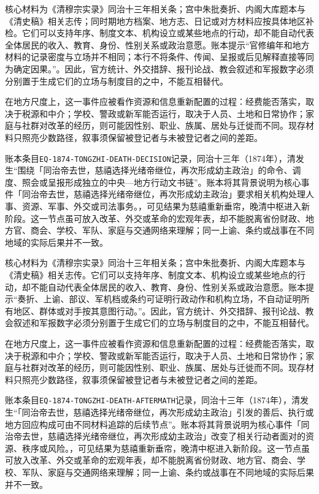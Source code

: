 核心材料为《清穆宗实录》同治十三年相关条；宫中朱批奏折、内阁大库题本与《清史稿》相关志传；同时期地方档案、地方志、日记或对方材料应按具体地区补检。它们可以支持年序、制度文本、机构设立或某些地点的行动，却不能自动代表全体居民的收入、教育、身份、性别关系或政治意愿。账本提示“官修编年和地方材料的记录密度与立场并不相同；本行不将条件、传闻、呈报或后见解释直接等同为确定因果。”。因此，官方统计、外交措辞、报刊论战、教会叙述和军报数字必须分别置于生成它们的立场与制度目的之中，不能互相替代。

在地方尺度上，这一事件应被看作资源和信息重新配置的过程：经费能否落实，取决于税源和中介；学校、警政或新军能否运行，取决于人员、土地和日常协作；家庭与社群对改革的经历，则可能因性别、职业、族属、居处与迁徙而不同。现存材料只照亮少数路径，叙事须保留被登记者与未被登记者之间的差距。

账本条目\texttt{EQ-1874-TONGZHI-DEATH-DECISION}记录，同治十三年（1874年），清发生“围绕「同治帝去世，慈禧选择光绪帝继位，再次形成幼主政治」的命令、调度、照会或呈报形成独立的中央—地方行动文书链”。账本将其背景说明为核心事件「同治帝去世，慈禧选择光绪帝继位，再次形成幼主政治」要求相关机构处理人事、资源、军事、外交或司法事务。，可见结果为慈禧重新垂帘，晚清中枢进入新阶段。这一节点虽可放入改革、外交或革命的宏观年表，却不能脱离省份财政、地方官、商会、学校、军队、家庭与交通网络来理解；同一上谕、条约或战事在不同地域的实际后果并不一致。

核心材料为《清穆宗实录》同治十三年相关条；宫中朱批奏折、内阁大库题本与《清史稿》相关志传。它们可以支持年序、制度文本、机构设立或某些地点的行动，却不能自动代表全体居民的收入、教育、身份、性别关系或政治意愿。账本提示“奏折、上谕、部议、军机档或条约可证明行政动作和机构立场，不自动证明所有地区、群体或对手按其意图行动。”。因此，官方统计、外交措辞、报刊论战、教会叙述和军报数字必须分别置于生成它们的立场与制度目的之中，不能互相替代。

在地方尺度上，这一事件应被看作资源和信息重新配置的过程：经费能否落实，取决于税源和中介；学校、警政或新军能否运行，取决于人员、土地和日常协作；家庭与社群对改革的经历，则可能因性别、职业、族属、居处与迁徙而不同。现存材料只照亮少数路径，叙事须保留被登记者与未被登记者之间的差距。

账本条目\texttt{EQ-1874-TONGZHI-DEATH-AFTERMATH}记录，同治十三年（1874年），清发生“「同治帝去世，慈禧选择光绪帝继位，再次形成幼主政治」引发的善后、执行或地方回应构成可由不同材料追踪的后续节点”。账本将其背景说明为核心事件「同治帝去世，慈禧选择光绪帝继位，再次形成幼主政治」改变了相关行动者面对的资源、秩序或风险。，可见结果为慈禧重新垂帘，晚清中枢进入新阶段。这一节点虽可放入改革、外交或革命的宏观年表，却不能脱离省份财政、地方官、商会、学校、军队、家庭与交通网络来理解；同一上谕、条约或战事在不同地域的实际后果并不一致。

